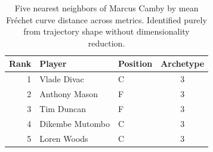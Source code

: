 \begin{table}[htbp]
  \centering\small
  \begin{tabular}{rllc}
    \toprule
    Rank & Player & Position & Archetype \\
    \midrule
    1 & Vlade Divac & C & 3 \\
    2 & Anthony Mason & F & 3 \\
    3 & Tim Duncan & F & 3 \\
    4 & Dikembe Mutombo & C & 3 \\
    5 & Loren Woods & C & 3 \\
    \bottomrule
  \end{tabular}
  \caption{Five nearest neighbors of Marcus Camby by mean Fr\'{e}chet curve distance across metrics. Identified purely from trajectory shape without dimensionality reduction.}
  \label{tab:Marcus_Camby_frechet_curve_neighbors}
\end{table}

